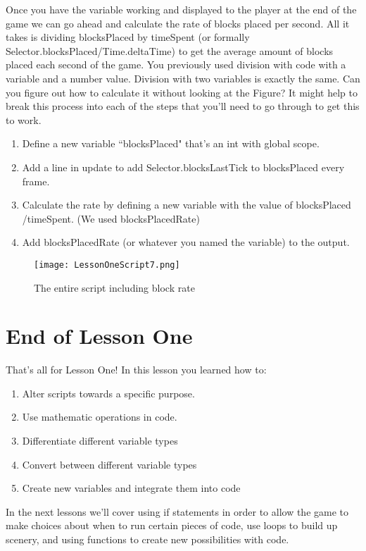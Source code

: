 \documentclass{article}
\begin{document}
Once you have the variable working and displayed to the player at the end of the game we can go ahead and calculate the rate of blocks placed per second. All it takes is dividing blocksPlaced by timeSpent (or formally Selector.blocksPlaced/Time.deltaTime) to get the average amount of blocks placed each second of the game. You previously used division with code with a variable and a number value. Division with two variables is exactly the same. Can you figure out how to calculate it without looking at the Figure? It might help to break this process into each of the steps that you'll need to go through to get this to work. 

\begin{enumerate}
\item Define a new variable ``blocksPlaced" that's an int with global scope.
\item Add a line in update to add Selector.blocksLastTick to blocksPlaced every frame.
\item Calculate the rate by defining a new variable with the value of blocksPlaced /timeSpent. (We used blocksPlacedRate)
\item Add blocksPlacedRate (or whatever you named the variable) to the output.
\end{enumerate}

\begin{figure}
  \texttt{[image: LessonOneScript7.png]}
  \caption{The entire script including block rate}
  \label{fig:code7}
\end{figure}

\section{End of Lesson One}

That's all for Lesson One! In this lesson you learned how to:

\begin{enumerate}
 \item Alter scripts towards a specific purpose.
 \item Use mathematic operations in code.
 \item Differentiate different variable types
 \item Convert between different variable types
 \item Create new variables and integrate them into code
\end{enumerate}

In the next lessons we'll cover using if statements in order to allow the game to make choices about when to run certain pieces of code, use loops to build up scenery, and using functions to create new possibilities with code.
\end{document}
